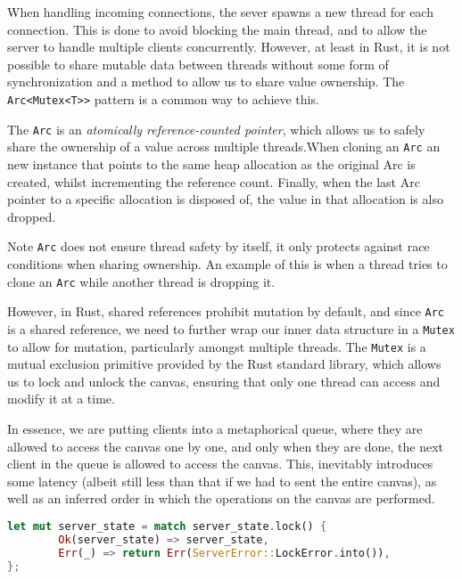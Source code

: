 \documentclass{article}
\newcommand{\code}[1]{\texttt{#1}}
\begin{document}
When handling incoming connections, the sever spawns a new thread for each
connection. This is done to avoid blocking the main thread, and to allow the
server to handle multiple clients concurrently. However, at least in Rust, it is
not possible to share mutable data between threads without some form of
synchronization and a method to allow us to share value ownership.  The
\code{Arc<Mutex<T>>} pattern is a common way to achieve this.

The \code{Arc} is an \textit{atomically reference-counted pointer}, which allows
us to safely share the ownership of a value across multiple threads.When cloning
an \code{Arc} an new instance that points to the same heap allocation as the
original Arc is created, whilst incrementing the reference count. Finally, when the last
Arc pointer to a specific allocation is disposed of, the value in that
allocation is also dropped.

\begin{mainbox}{Note}
    \code{Arc} does not ensure thread safety by itself, it only protects against
    race conditions when sharing ownership. An example of this is when a thread
    tries to clone an \code{Arc} while another thread is dropping it.
\end{mainbox}

However, in Rust, shared references prohibit mutation by default, and since
\code{Arc} is a shared reference, we need to further wrap our inner data
structure in a \code{Mutex} to allow for mutation, particularly amongst multiple
threads. The \code{Mutex} is a mutual exclusion primitive provided by the Rust
standard library, which allows us to lock and unlock the canvas, ensuring that
only one thread can access and modify it at a time.

In essence, we are putting clients into a metaphorical queue, where they are
allowed to access the canvas one by one, and only when they are done, the next
client in the queue is allowed to access the canvas. This, inevitably introduces
some latency (albeit still less than that if we had to sent the entire canvas), as well as an inferred order in which the operations on the canvas
are performed.

\begin{subbox}{}
    \lstset{xleftmargin=0\textwidth, xrightmargin=0\textwidth}
    \begin{lstlisting}[language=Rust]
let mut server_state = match server_state.lock() {
        Ok(server_state) => server_state,
        Err(_) => return Err(ServerError::LockError.into()),
};
    \end{lstlisting}
\end{subbox}
\end{document}
